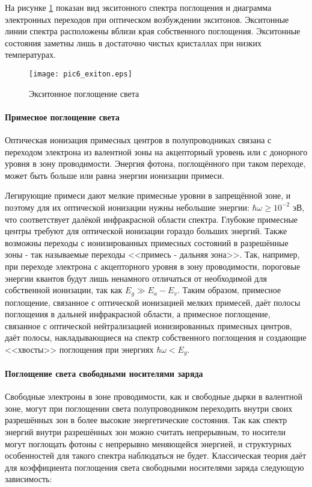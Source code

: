 На рисунке \ref{pic6_exiton} показан вид экситонного спектра поглощения и диаграмма электронных переходов при оптическом возбуждении экситонов. Экситонные линии спектра расположены вблизи края собственного поглощения. Экситонные состояния заметны лишь в достаточно чистых кристаллах при низких температурах.

\begin{figure}[h!]\centering
\texttt{[image: pic6\_exiton.eps]}
\caption{Экситонное поглощение света}
\label{pic6_exiton}
\end{figure}

\paragraph{Примесное поглощение света}
Оптическая ионизация примесных центров в полупроводниках связана с переходом электрона из валентной зоны на акцепторный уровень или с донорного уровня в зону проводимости. Энергия фотона, поглощённого при таком переходе, может быть больше или равна энергии ионизации примеси.

Легирующие примеси дают мелкие примесные уровни в запрещённой зоне, и поэтому для их оптической ионизации нужны небольшие энергии: $\hbar \omega \ge 10^{-2}$ эВ, что соответствует далёкой инфракрасной области спектра. Глубокие примесные центры требуют для оптической ионизации гораздо больших энергий. Также возможны переходы с ионизированных примесных состояний в разрешённые зоны - так называемые переходы <<примесь - дальняя зона>>. Так, например, при переходе электрона с акцепторного уровня в зону проводимости, пороговые энергии квантов будут лишь ненамного отличаться от необходимой для собственной ионизации, так как $E_{g} \gg E_{a}-E_{v}$. Таким образом, примесное поглощение, связанное с оптической ионизацией мелких примесей, даёт полосы поглощения в дальней инфракрасной области, а примесное поглощение, связанное с оптической нейтрализацией ионизированных примесных центров, даёт полосы, накладывающиеся на спектр собственного поглощения и создающие <<хвосты>> поглощения при энергиях $\hbar \omega < E_{g}$.

\paragraph{Поглощение света свободными носителями заряда}
Свободные электроны в зоне проводимости, как и свободные дырки в валентной зоне, могут при поглощении света полупроводником переходить внутри своих разрешённых зон в более высокие энергетические состояния. Так как спектр энергий внутри разрешённых зон можно считать непрерывным, то носители могут поглощать фотоны с непрерывно меняющейся энергией, и структурных особенностей для такого спектра наблюдаться не будет. Классическая теория даёт для коэффициента поглощения света свободными носителями заряда следующую зависимость:

